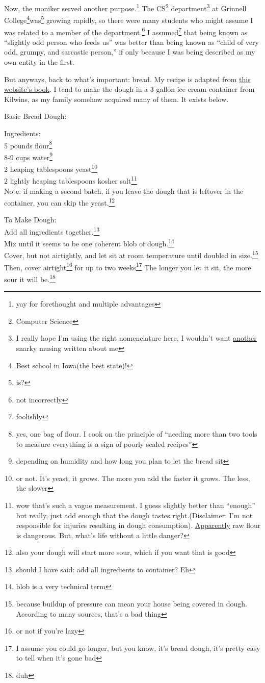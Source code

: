 \documentclass[12pt]{article}[titlepage]
\newcommand{\say}[1]{``#1''}
\newcommand{\1}{\={a}}
\newcommand{\2}{\={e}}
\newcommand{\3}{\={\i}}
\newcommand{\4}{\=o}
\newcommand{\5}{\=u}
\newcommand{\6}{\={A}}
\renewcommand{\,}{\textsuperscript{,}}
\begin{document}
Now, the moniker served another purpose.\footnote{yay for forethought and multiple advantages}
The CS\footnote{Computer Science} department\footnote{I really hope I'm using the right nomenclature here, I wouldn't want \href{http://www.cs.grinnell.edu/~rebelsky/musings/busses-bussing}{another} snarky musing written about me} at Grinnell College\footnote{Best school in Iowa(the best state)!}was\footnote{is?} growing rapidly, so there were many students who might assume I was related to a member of the department.\footnote{not incorrectly}
I assumed\footnote{foolishly} that being known as \say{slightly odd person who feeds us} was better than being known as \say{child of very odd, grumpy, and sarcastic person,} if only because I was being described as my own entity in the first.

But anyways, back to what's important: bread.
My recipe is adapted from \href{https://artisanbreadinfive.com}{this website's book}.
I tend to make the dough in a 3 gallon ice cream container from Kilwins, as my family somehow acquired many of them.
It exists below.

Basic Bread Dough:

Ingredients:\\
5 pounds flour\footnote{yes, one bag of flour. I cook on the principle of \say{needing more than two tools to measure everything is a sign of poorly scaled recipes}}\\
8-9 cups water\footnote{depending on humidity and how long you plan to let the bread sit}\\
2 heaping tablespoons yeast\footnote{or not. It's yeast, it grows. The more you add the faster it grows. The less, the slower}\\
2 lightly heaping tablespoons kosher salt\footnote{wow that's such a vague measurement. I guess slightly better than \say{enough} but really, just add enough that the dough tastes right.(Disclaimer: I'm not responsible for injuries resulting in dough consumption). \href{https://www.fda.gov/ForConsumers/ConsumerUpdates/ucm508450.htm}{Apparently} raw flour is dangerous. But, what's life without a little danger?}\\
Note: if making a second batch, if you leave the dough that is leftover in the container, you can skip the yeast.\footnote{also your dough will start more sour, which if you want that is good}

To Make Dough:\\
Add all ingredients together.\footnote{should I have said: add all ingredients to container? Eh}\\
Mix until it seems to be one coherent blob of dough.\footnote{blob is a very technical term}\\
Cover, but not airtightly, and let sit at room temperature until doubled in size.\footnote{because buildup of pressure can mean your house being covered in dough. According to many sources, that's a bad thing}\\
Then, cover airtight\footnote{or not if you're lazy} for up to two weeks\footnote{I assume you could go longer, but you know, it's bread dough, it's pretty easy to tell when it's gone bad}
The longer you let it sit, the more sour it will be.\footnote{duh}
\end{document}
